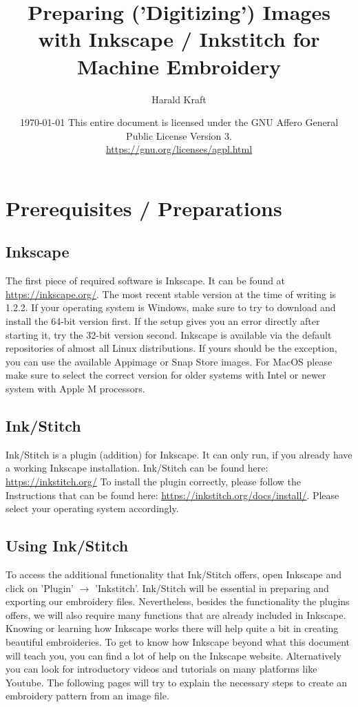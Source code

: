 \documentclass{article}
\title{
    Preparing ('Digitizing') Images with Inkscape / Inkstitch for\\
    Machine Embroidery}
\author{Harald Kraft}
\date{
    \today
    \bigbreak
    This entire document is licensed under the GNU Affero General Public License Version 3.\\
    \url{https://gnu.org/licenses/agpl.html}}
\begin{document}
    \maketitle

    \tableofcontents

    \pagebreak

    \section{Prerequisites / Preparations}
        \subsection{Inkscape}
            The first piece of required software is Inkscape. It can be found at \url{https://inkscape.org/}. The most recent stable version at the time of writing is 1.2.2.
            If your operating system is Windows, make sure to try to download and install the 64-bit version first. If the setup gives you an error directly after starting it, try the 32-bit version second.
            Inkscape is available via the default repositories of almost all Linux distributions. If yours should be the exception, you can use the available Appimage or Snap Store images.
            For MacOS please make sure to select the correct version for older systems with Intel or newer system with Apple M processors.

        \subsection{Ink/Stitch}

            Ink/Stitch is a plugin (addition) for Inkscape. It can only run, if you already have a working Inkscape installation. Ink/Stitch can be found here: \url{https://inkstitch.org/}
            To install the plugin correctly, please follow the Instructions that can be found here: \url{https://inkstitch.org/docs/install/}. Please select your operating system accordingly.

        \subsection{Using Ink/Stitch}

            To access the additional functionality that Ink/Stitch offers, open Inkscape and click on 'Plugin' $\rightarrow$ 'Inkstitch'.
            Ink/Stitch will be essential in preparing and exporting our embroidery files. Nevertheless, besides the functionality the plugins offers, we will also require many functions that are already included in Inkscape.
            Knowing or learning how Inkscape works there will help quite a bit in creating beautiful embroideries.
            To get to know how Inkscape beyond what this document will teach you, you can find a lot of help on the Inkscape website. Alternatively you can look for introductory videos and tutorials on many platforms like Youtube.
            \smallbreak
            The following pages will try to explain the necessary steps to create an embroidery pattern from an image file.
\end{document}
